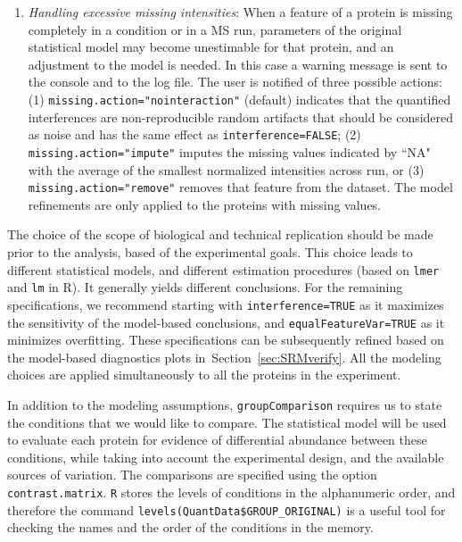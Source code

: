 \documentclass[11pt]{article}
\def\secref#1{Section~\ref{sec:#1}}
\begin{document}
\begin{enumerate}
\item {\it Handling excessive missing intensities}: When a feature of a protein is missing completely in a condition or in a MS run, parameters of the original statistical model may become unestimable for that protein, and an adjustment to the model is needed. In this case a warning message is sent to the console and to the log file. The user is notified of three possible actions: (1)  {\tt missing.action="nointeraction"} (default) indicates that the quantified interferences are non-reproducible random artifacts that should be considered as noise and has the same effect as {\tt interference=FALSE}; (2) {\tt missing.action="impute"} imputes the missing values indicated by ``NA" with the average of the smallest normalized intensities across run, or (3) {\tt missing.action="remove"} removes that feature from the dataset. The model refinements are only applied to the proteins with missing values.

\end{enumerate}

The choice of the scope of biological and technical replication should be made prior to the analysis, based of the experimental goals. This choice leads to different statistical models, and different estimation procedures (based on {\tt lmer} and {\tt lm} in R). It generally yields different conclusions. For the remaining specifications, we recommend starting with {\tt interference=TRUE} as it maximizes the sensitivity of the model-based conclusions, and {\tt equalFeatureVar=TRUE} as it minimizes overfitting. These specifications can be subsequently refined based on the model-based diagnostics plots in~\secref{SRMverify}. All the modeling choices are applied simultaneously to all the proteins in the experiment.

In addition to the modeling assumptions, {\tt groupComparison} requires us to state the conditions that we would like to compare. The statistical model will be used to evaluate each protein for evidence of differential abundance between these conditions, while taking into account the experimental design, and the available sources of variation. The comparisons are specified using the option {\tt contrast.matrix}. {\tt R} stores the levels of conditions in the alphanumeric order, and therefore the command {\tt levels(QuantData\$GROUP\_ORIGINAL)} is a useful tool for checking the names and the order of the conditions in the memory.
\end{document}

